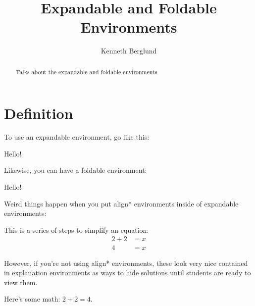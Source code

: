 \documentclass{ximera}
\title{Expandable and Foldable Environments}
\author{Kenneth Berglund}
\begin{document}
\begin{abstract}
Talks about the expandable and foldable environments. 
\end{abstract}
\maketitle

\section{Definition}

To use an expandable environment, go like this:
\begin{expandable}
Hello!
\end{expandable}

Likewise, you can have a foldable environment:
\begin{foldable}
Hello!
\end{foldable}

Weird things happen when you put align* environments inside of expandable environments:

\begin{expandable}
This is a series of steps to simplify an equation:
\begin{align*}
2 + 2 & = x \\
4 & = x
\end{align*}
\end{expandable}

However, if you're not using align* environments, these look very nice contained in explanation environments as ways to hide solutions until students are ready to view them. 
\begin{explanation}
	\begin{expandable}
		Here's some math: $2 + 2 = 4$. 
	\end{expandable}
\end{explanation}
\end{document}
